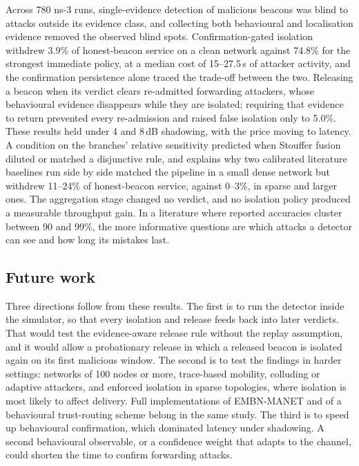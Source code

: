 \documentclass[pdflatex,sn-mathphys-num]{sn-jnl}%
\theoremstyle{thmstyleone}%
\theoremstyle{thmstyletwo}%
\theoremstyle{thmstylethree}%
\begin{document}
Across 780 ns-3 runs, single-evidence detection of malicious beacons was blind
to attacks outside its evidence class, and collecting both behavioural and
localisation evidence removed the observed blind spots. Confirmation-gated
isolation withdrew 3.9\% of honest-beacon service on a clean network against
74.8\% for the strongest immediate policy, at a median cost of 15--27.5\,s of
attacker activity, and the confirmation persistence alone traced the
trade-off between the two. Releasing a beacon when its verdict clears
re-admitted forwarding attackers, whose behavioural evidence disappears while
they are isolated; requiring that evidence to return prevented every
re-admission and raised false isolation only to 5.0\%. These results held
under 4 and 8\,dB shadowing, with the price moving to latency. A condition on
the branches' relative sensitivity predicted when Stouffer fusion diluted or
matched a disjunctive rule, and explains why two calibrated literature
baselines run side by side matched the pipeline in a small dense network but
withdrew 11--24\% of honest-beacon service, against 0--3\%, in sparse and
larger ones. The aggregation stage changed no verdict, and no isolation policy
produced a measurable throughput gain. In a literature where reported
accuracies cluster between 90 and 99\%, the more informative questions are
which attacks a detector can see and how long its mistakes last.

\subsection{Future work}
\label{sec:future}

Three directions follow from these results. The first is to run the detector
inside the simulator, so that every isolation and release feeds back into
later verdicts. That would test the evidence-aware release rule without the
replay assumption, and it would allow a probationary release in which a
released beacon is isolated again on its first malicious window. The second
is to test the findings in harder settings: networks of 100 nodes or more,
trace-based mobility, colluding or adaptive attackers, and enforced
isolation in sparse topologies, where isolation is most likely to affect
delivery. Full implementations of EMBN-MANET and of a behavioural
trust-routing scheme belong in the same study. The third is to speed up
behavioural confirmation, which dominated latency under shadowing. A second
behavioural observable, or a confidence weight that adapts to the channel,
could shorten the time to confirm forwarding attacks.
\end{document}
